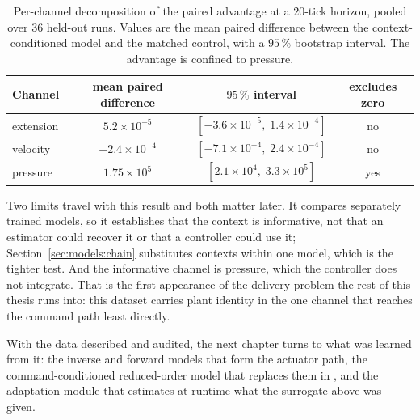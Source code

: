 \begin{table}[H]
  \centering
  \caption{Per-channel decomposition of the paired advantage at a $20$-tick
  horizon, pooled over $36$ held-out runs. Values are the mean paired difference
  between the context-conditioned model and the matched control, with a
  $95\,\%$ bootstrap interval. The advantage is confined to pressure.}
  \label{tab:data:latent-channels}
  \begin{tabular}{lccc}
    \toprule
    Channel & mean paired difference & $95\,\%$ interval & excludes zero \\
    \midrule
    extension & $5.2\times10^{-5}$ & $[-3.6\times10^{-5},\; 1.4\times10^{-4}]$ & no \\
    velocity  & $-2.4\times10^{-4}$ & $[-7.1\times10^{-4},\; 2.4\times10^{-4}]$ & no \\
    pressure  & $1.75\times10^{5}$ & $[2.1\times10^{4},\; 3.3\times10^{5}]$ & yes \\
    \bottomrule
  \end{tabular}
\end{table}

Two limits travel with this result and both matter later. It compares separately
trained models, so it establishes that the context is informative, not that an
estimator could recover it or that a controller could use it;
Section~\ref{sec:models:chain} substitutes contexts within one model, which is
the tighter test. And the informative channel is pressure, which the controller
does not integrate. That is the first appearance of the delivery problem the
rest of this thesis runs into: this dataset carries plant identity in the one
channel that reaches the command path least directly.

With the data described and audited, the next chapter turns to what was
learned from it: the inverse and forward models that form the
\ppoIDFD{} actuator path, the command-conditioned reduced-order model that
replaces them in \ppoROM, and the adaptation module that estimates at runtime
what the surrogate above was given.
